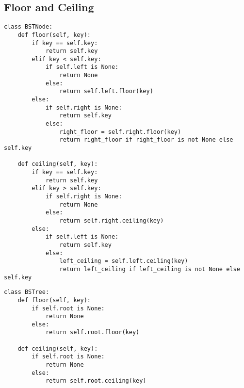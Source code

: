 \documentclass[a4paper]{article}
\begin{document}
\subsection*{Floor and Ceiling}
\begin{lstlisting}
class BSTNode:
    def floor(self, key):
        if key == self.key:
            return self.key
        elif key < self.key:
            if self.left is None:
                return None
            else:
                return self.left.floor(key)
        else:
            if self.right is None:
                return self.key
            else:
                right_floor = self.right.floor(key)
                return right_floor if right_floor is not None else self.key
            
    def ceiling(self, key):
        if key == self.key:
            return self.key
        elif key > self.key:
            if self.right is None:
                return None
            else:
                return self.right.ceiling(key)
        else:
            if self.left is None:
                return self.key
            else:
                left_ceiling = self.left.ceiling(key)
                return left_ceiling if left_ceiling is not None else self.key
\end{lstlisting}
\begin{lstlisting}
class BSTree:
    def floor(self, key):
        if self.root is None:
            return None
        else:
            return self.root.floor(key)
        
    def ceiling(self, key):
        if self.root is None:
            return None
        else:
            return self.root.ceiling(key)
\end{lstlisting}
\end{document}
